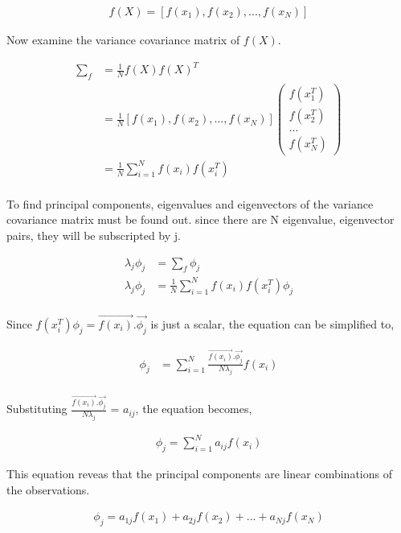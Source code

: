 \documentclass[11pt, a4paper]{article}
\begin{document}
\begin{align*}
    f(X) = [f(x_1), f(x_2), ..., f(x_N)]
\end{align*}

Now examine the variance covariance matrix of $f(X)$.

\begin{align*}
    \sum_f &= \frac{1}{N}f(X)f(X)^T \\
           &= \frac{1}{N}[f(x_1), f(x_2), ..., f(x_N)]\begin{pmatrix}
               f(x_1^T) \\
               f(x_2^T) \\
               ... \\
               f(x_N^T) 
           \end{pmatrix} \\
           &= \frac{1}{N} \sum_{i = 1}^{N} f(x_i)f(x_i^T) \\
\end{align*}

To find principal components, eigenvalues and eigenvectors of the variance covariance matrix must be found out. since there are N eigenvalue, eigenvector pairs, they will be subscripted by j.

\begin{align*}
    \lambda_j\phi_j &= \sum_f\phi_j\\
    \lambda_j\phi_j &= \frac{1}{N} \sum_{i = 1}^{N} f(x_i)f(x_i^T)\phi_j \\
\end{align*}

Since $f(x_i^T)\phi_j = \vec{f(x_i)}.\vec{\phi_j}$ is just a scalar, the equation can be simplified to,

\begin{align*}
    \phi_j &= \sum_{i = 1}^{N} \frac{\vec{f(x_i)}.\vec{\phi_j}}{N\lambda_j}f(x_i) \\
\end{align*}

Substituting $\frac{\vec{f(x_i)}.\vec{\phi_j}}{N\lambda_j}$ = $a_{ij}$, the equation becomes,

\begin{align*}
    \phi_j = \sum_{i = 1}^{N} a_{ij} f(x_i) 
\end{align*} 

This equation reveas that the principal components are linear combinations of the observations.

\begin{align*}
    \phi_j = a_{1j}f(x_1) + a_{2j}f(x_2) + ... + a_{Nj}f(x_N) \\ 
\end{align*}
\end{document}

